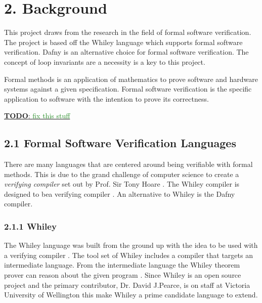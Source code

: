 \documentclass[11pt, a4paper, twoside, openright]{report}
\newcommand{\todo}[1]{\huge{\underline{\textbf{\textcolor{RubineRed}{TODO}}: \textcolor{ForestGreen}{#1}}}\normalsize }
\begin{document}
\section*{2. Background}

This project draws from the research in the field of formal software verification.
The project is based off the Whiley language which supports formal software
verification. Dafny is an alternative choice for formal software verification.
The concept of loop invariants are a necessity is a key to this project.

Formal methods is an application of mathematics to prove software and hardware
systems against a given specification. %
Formal software verification is the specific application to software with
the intention to prove its correctness.

\todo{fix this stuff}


\subsection*{2.1 Formal Software Verification Languages}

There are many languages that are centered around being verifiable
with formal methods.
This is due to the grand challenge of computer science
to create a \textit{verifying compiler} set out by Prof. Sir Tony Hoare \cite{Hoare-grand}.
The Whiley compiler is designed to bea verifying compiler \cite{whiley-origin}.
An alternative to Whiley is the Dafny compiler.

\subsubsection*{2.1.1 Whiley}

The Whiley language was built from the ground up with the idea to be used with
a verifying compiler \cite{whiley-origin}.
The tool set of Whiley includes a compiler that targets an intermediate
language. From the intermediate language the Whiley theorem prover can reason
about the given program \cite{whiley-design} \cite{whiley-origin}.
Since Whiley is an open source project and the primary contributor, Dr. David
J.Pearce, is on staff at Victoria University of Wellington this make Whiley a
prime candidate language to extend.
\end{document}
